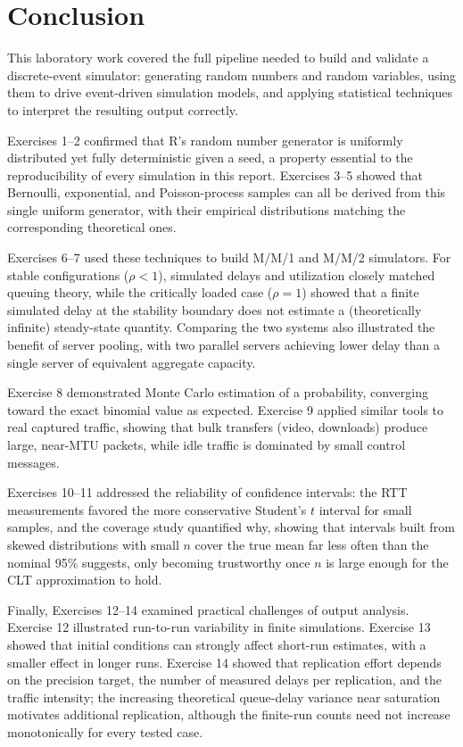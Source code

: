 \documentclass[12pt]{article}
\begin{document}
\section{Conclusion}

This laboratory work covered the full pipeline needed to build and validate a discrete-event simulator: generating random numbers and random variables, using them to drive event-driven simulation models, and applying statistical techniques to interpret the resulting output correctly.

Exercises 1--2 confirmed that R's random number generator is uniformly distributed yet fully deterministic given a seed, a property essential to the reproducibility of every simulation in this report. Exercises 3--5 showed that Bernoulli, exponential, and Poisson-process samples can all be derived from this single uniform generator, with their empirical distributions matching the corresponding theoretical ones.

Exercises 6--7 used these techniques to build M/M/1 and M/M/2 simulators. For stable configurations ($\rho<1$), simulated delays and utilization closely matched queuing theory, while the critically loaded case ($\rho=1$) showed that a finite simulated delay at the stability boundary does not estimate a (theoretically infinite) steady-state quantity. Comparing the two systems also illustrated the benefit of server pooling, with two parallel servers achieving lower delay than a single server of equivalent aggregate capacity.

Exercise 8 demonstrated Monte Carlo estimation of a probability, converging toward the exact binomial value as expected. Exercise 9 applied similar tools to real captured traffic, showing that bulk transfers (video, downloads) produce large, near-MTU packets, while idle traffic is dominated by small control messages.

Exercises 10--11 addressed the reliability of confidence intervals: the RTT measurements favored the more conservative Student's $t$ interval for small samples, and the coverage study quantified why, showing that intervals built from skewed distributions with small $n$ cover the true mean far less often than the nominal 95\% suggests, only becoming trustworthy once $n$ is large enough for the CLT approximation to hold.

Finally, Exercises 12--14 examined practical challenges of output analysis. Exercise 12 illustrated run-to-run variability in finite simulations. Exercise 13 showed that initial conditions can strongly affect short-run estimates, with a smaller effect in longer runs. Exercise 14 showed that replication effort depends on the precision target, the number of measured delays per replication, and the traffic intensity; the increasing theoretical queue-delay variance near saturation motivates additional replication, although the finite-run counts need not increase monotonically for every tested case.
\end{document}
